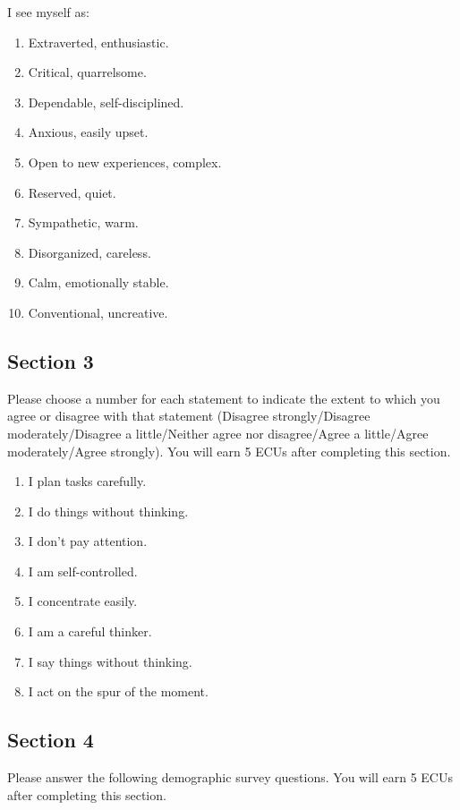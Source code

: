 \documentclass[11pt]{article}
\begin{document}
I see myself as:
\begin{enumerate}
\item Extraverted, enthusiastic.
  \item  Critical, quarrelsome.
  \item  Dependable, self-disciplined.
  \item  Anxious, easily upset.
  \item  Open to new experiences, complex.
  \item  Reserved, quiet.
  \item  Sympathetic, warm.
  \item  Disorganized, careless.
  \item  Calm, emotionally stable.
  \item  Conventional, uncreative.
\end{enumerate}

\newpage

\subsection*{Section 3}

Please choose a number for each statement to indicate the extent to which you agree or disagree with that statement (Disagree strongly/Disagree moderately/Disagree a little/Neither agree nor disagree/Agree a little/Agree moderately/Agree strongly). You will earn 5 ECUs after completing this section.


\begin{enumerate}
  \item  I plan tasks carefully.  
  \item I do things without thinking. 
  \item I don’t pay attention. 
  \item I am self-controlled. 
  \item I concentrate easily.  
  \item I am a careful thinker. 
  \item I say things without thinking.  
  \item I act on the spur of the moment.
\end{enumerate}


\newpage


\subsection*{Section 4}

Please answer the following demographic survey questions. You will earn 5 ECUs after completing this section.
\end{document}
